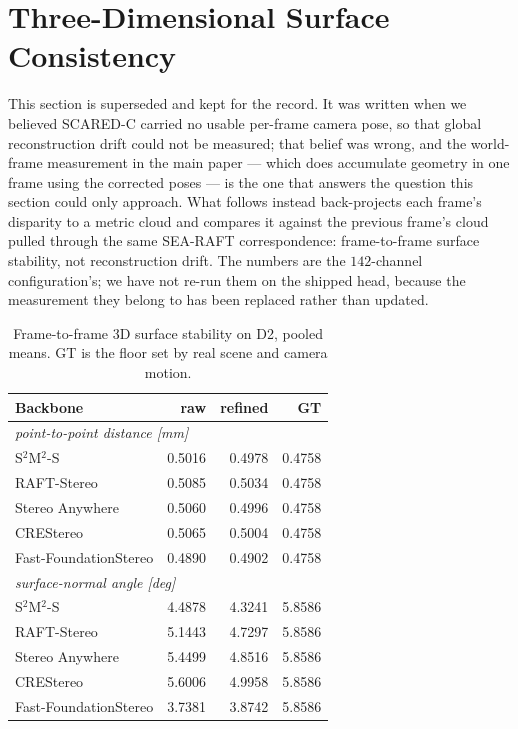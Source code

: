 \documentclass[letterpaper,10pt,conference]{ieeeconf}
\begin{document}
\section{Three-Dimensional Surface Consistency}
\label{sup:3d}

This section is superseded and kept for the record. It was written when we
believed SCARED-C carried no usable per-frame camera pose, so that global
reconstruction drift could not be measured; that belief was wrong, and the
world-frame measurement in the main paper --- which does accumulate geometry
in one frame using the corrected poses --- is the one that answers the
question this section could only approach. What follows instead back-projects
each frame's disparity to a metric cloud and compares it against the previous
frame's cloud pulled through the same SEA-RAFT correspondence: frame-to-frame
surface stability, not reconstruction drift. The numbers are the
$142$-channel configuration's; we have not re-run them on the shipped head,
because the measurement they belong to has been replaced rather than
updated.

\begin{table}[htb]
\centering
\small
\caption{Frame-to-frame 3D surface stability on D2, pooled means.
GT is the floor set by real scene and camera motion.}
\label{sup:3dtab}
\begin{tabular}{lrrr}
\toprule
Backbone & raw & refined & GT \\
\midrule
\multicolumn{4}{l}{\emph{point-to-point distance [mm]}}\\
S$^2$M$^2$-S          & 0.5016 & 0.4978 & 0.4758 \\
RAFT-Stereo           & 0.5085 & 0.5034 & 0.4758 \\
Stereo Anywhere       & 0.5060 & 0.4996 & 0.4758 \\
CREStereo             & 0.5065 & 0.5004 & 0.4758 \\
Fast-FoundationStereo & 0.4890 & 0.4902 & 0.4758 \\
\midrule
\multicolumn{4}{l}{\emph{surface-normal angle [deg]}}\\
S$^2$M$^2$-S          & 4.4878 & 4.3241 & 5.8586 \\
RAFT-Stereo           & 5.1443 & 4.7297 & 5.8586 \\
Stereo Anywhere       & 5.4499 & 4.8516 & 5.8586 \\
CREStereo             & 5.6006 & 4.9958 & 5.8586 \\
Fast-FoundationStereo & 3.7381 & 3.8742 & 5.8586 \\
\bottomrule
\end{tabular}
\end{table}
\end{document}
